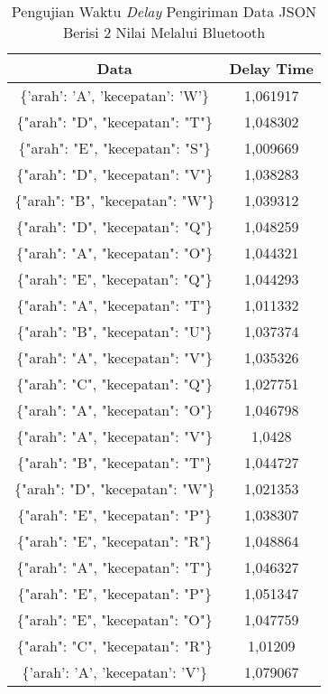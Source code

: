 \begin{table}[!ht]
  \centering
  \caption{Pengujian Waktu \emph{Delay} Pengiriman Data JSON Berisi 2 Nilai Melalui Bluetooth}
  \label{tbl:delayBluetoothJSON2}
  \begin{tabular}{|c|c|}
  \hline
  Data                              & Delay Time  \\ \hline
  \{'arah': 'A', 'kecepatan': 'W'\} & 1,061917    \\ \hline
  \{"arah": "D", "kecepatan": "T"\} & 1,048302    \\ \hline
  \{"arah": "E", "kecepatan": "S"\} & 1,009669    \\ \hline
  \{"arah": "D", "kecepatan": "V"\} & 1,038283    \\ \hline
  \{"arah": "B", "kecepatan": "W"\} & 1,039312    \\ \hline
  \{"arah": "D", "kecepatan": "Q"\} & 1,048259    \\ \hline
  \{"arah": "A", "kecepatan": "O"\} & 1,044321    \\ \hline
  \{"arah": "E", "kecepatan": "Q"\} & 1,044293    \\ \hline
  \{"arah": "A", "kecepatan": "T"\} & 1,011332    \\ \hline
  \{"arah": "B", "kecepatan": "U"\} & 1,037374    \\ \hline
  \{"arah": "A", "kecepatan": "V"\} & 1,035326    \\ \hline
  \{"arah": "C", "kecepatan": "Q"\} & 1,027751    \\ \hline
  \{"arah": "A", "kecepatan": "O"\} & 1,046798    \\ \hline
  \{"arah": "A", "kecepatan": "V"\} & 1,0428      \\ \hline
  \{"arah": "B", "kecepatan": "T"\} & 1,044727    \\ \hline
  \{"arah": "D", "kecepatan": "W"\} & 1,021353    \\ \hline
  \{"arah": "E", "kecepatan": "P"\} & 1,038307    \\ \hline
  \{"arah": "E", "kecepatan": "R"\} & 1,048864    \\ \hline
  \{"arah": "A", "kecepatan": "T"\} & 1,046327    \\ \hline
  \{"arah": "E", "kecepatan": "P"\} & 1,051347    \\ \hline
  \{"arah": "E", "kecepatan": "O"\} & 1,047759    \\ \hline
  \{"arah": "C", "kecepatan": "R"\} & 1,01209     \\ \hline
  \{'arah': 'A', 'kecepatan': 'V'\} & 1,079067    \\ \hline

\end{tabular}
\end{table}
